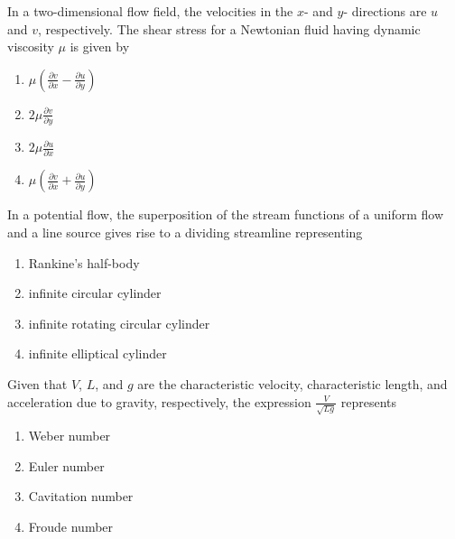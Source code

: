     \item {
    	In a two-dimensional flow field, the velocities in the $x$- and $y$- directions are $u$ and $v$, respectively. The shear stress for a Newtonian fluid having dynamic viscosity $\mu$ is given by
    	
    	
    	\begin{multicols}{4}
    		\begin{enumerate}
    			\item $
    			\mu \left( \frac{\partial v}{\partial x} - \frac{\partial u}{\partial y} \right)
    			$
    			
    			\item $
    			2\mu \frac{\partial v}{\partial y}
    			$
    			
    			\item $
    			2\mu \frac{\partial u}{\partial x}
    			$
    			
    			\item $
    			\mu \left( \frac{\partial v}{\partial x} + \frac{\partial u}{\partial y} \right)
    			$
    		\end{enumerate}
    	\end{multicols}
    
	}
    \item{
            In a potential flow, the superposition of the stream functions of a uniform flow and a line source gives rise to a dividing streamline representing
            
                
            \begin{multicols}{2}
                \begin{enumerate}
                	\item Rankine’s half-body
                	\item infinite circular cylinder
                	\item infinite rotating circular cylinder
                	\item infinite elliptical cylinder
                \end{enumerate}
            \end{multicols}

        
        }
    \item{
            Given that \(V\), \(L\), and \(g\) are the characteristic velocity, characteristic length, and acceleration due to gravity, respectively, the expression $
            \frac{V}{\sqrt{Lg}}
            $
            represents
          
            \begin{multicols}{2}
                \begin{enumerate}
                \item Weber number
                \item Euler number
                \item Cavitation number
                \item Froude number
                \end{enumerate}
            \end{multicols}
        
        }
